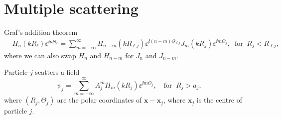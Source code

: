 \documentclass[ 12pt, a4paper]{article}
\renewcommand{\vec}[1]{\boldsymbol{#1}}
\begin{document}
%

\section{Multiple scattering}

Graf's addition theorem
\begin{align}
  & H_n(k R_\ell)\ee^{\ii n \Theta_\ell} =
  \sum_{m=-\infty}^\infty H_{n-m}(k R_{\ell j})\ee^{\ii(n-m)\Theta_{\ell j}} J_{m}(k R_j)\ee^{\ii m \Theta_j}, \;\;\text{for}\;\; R_j < R_{\ell j},
\label{eqn:Graf}
\end{align}
where we can also swap $H_n$ and $H_{n-m}$ for $J_n$ and $J_{n-m}$.

Particle-$j$ scatters a field
\begin{equation}
  \label{eqn:outwaves}
  \psi_j = \sum_{m=-\infty}^\infty A_j^m H_{m}(k R_j) \ee^{\ii m \Theta_j}, \quad \text{for} \;\; R_j > a_j,
\end{equation}
where $(R_j,\Theta_j)$ are the polar coordinates of $\vec x - \vec x_j$, where $\vec x_j$ is the centre of particle $j$.
\end{document}

